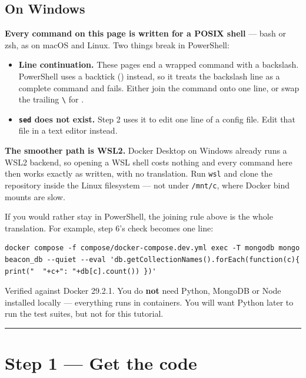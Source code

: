 \documentclass[
  10pt,
]{article}
\providecommand{\tightlist}{%
  \setlength{\itemsep}{0pt}\setlength{\parskip}{0pt}}
\begin{document}
\subsection{On Windows}\label{on-windows}

\textbf{Every command on this page is written for a POSIX shell} ---
bash or zsh, as on macOS and Linux. Two things break in PowerShell:

\begin{itemize}
\tightlist
\item
  \textbf{Line continuation.} These pages end a wrapped command with a
  backslash. PowerShell uses a backtick (\texttt{\textasciigrave{}})
  instead, so it treats the backslash line as a complete command and
  fails. Either join the command onto one line, or swap the trailing
  \texttt{\textbackslash{}} for \texttt{\textasciigrave{}}.
\item
  \textbf{\texttt{sed} does not exist.} Step 2 uses it to edit one line
  of a config file. Edit that file in a text editor instead.
\end{itemize}

\textbf{The smoother path is WSL2.} Docker Desktop on Windows already
runs a WSL2 backend, so opening a WSL shell costs nothing and every
command here then works exactly as written, with no translation. Run
\texttt{wsl} and clone the repository inside the Linux filesystem ---
not under \texttt{/mnt/c}, where Docker bind mounts are slow.

If you would rather stay in PowerShell, the joining rule above is the
whole translation. For example, step 6's check becomes one line:

\begin{verbatim}
docker compose -f compose/docker-compose.dev.yml exec -T mongodb mongo beacon_db --quiet --eval 'db.getCollectionNames().forEach(function(c){ print("  "+c+": "+db[c].count()) })'
\end{verbatim}

Verified against Docker 29.2.1. You do \textbf{not} need Python, MongoDB
or Node installed locally --- everything runs in containers. You will
want Python later to run the test suites, but not for this tutorial.

\begin{center}\rule{0.5\linewidth}{0.5pt}\end{center}

\section{Step 1 --- Get the code}\label{step-1-get-the-code}
\end{document}
